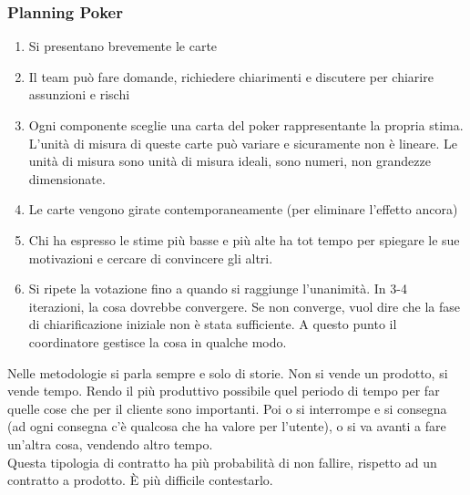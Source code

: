 \subsubsection{Planning Poker}
\begin{enumerate}
    \item Si presentano brevemente le carte
    \item Il team può fare domande, richiedere chiarimenti e discutere per chiarire assunzioni e rischi
    \item Ogni componente sceglie una carta del poker rappresentante la propria stima. L'unità di misura di queste carte può variare e sicuramente non è lineare. Le unità di misura sono unità di misura ideali, sono numeri, non grandezze dimensionate. 
    \item Le carte vengono girate contemporaneamente (per eliminare l'effetto ancora)
    \item Chi ha espresso le stime più basse e più alte ha tot tempo per spiegare le sue motivazioni e cercare di convincere gli altri.
    \item Si ripete la votazione fino a quando si raggiunge l'unanimità.  In 3-4 iterazioni, la cosa dovrebbe convergere. Se non converge, vuol dire che la fase di chiarificazione iniziale non è stata sufficiente. A questo punto il coordinatore gestisce la cosa in qualche modo.
\end{enumerate}
Nelle metodologie si parla sempre e solo di storie. Non si vende un prodotto, si vende tempo. Rendo il più produttivo possibile quel periodo di tempo per far quelle cose che per il cliente sono importanti. Poi o si interrompe e si consegna (ad ogni consegna c'è qualcosa che ha valore per l'utente), o si va avanti a fare un'altra cosa, vendendo altro tempo. \\
Questa tipologia di contratto ha più probabilità di non fallire, rispetto ad un contratto a prodotto. È più difficile contestarlo.

